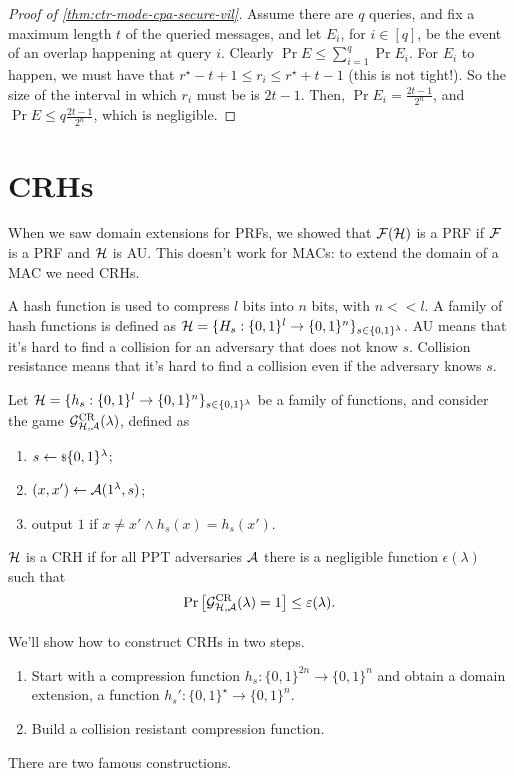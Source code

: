 \begin{proof}[Proof of \cref{thm:ctr-mode-cpa-secure-vil}]
	Assume there are $q$ queries, and fix a maximum length $t$ of the queried messages, and let $E_i$, for $i \in [q]$, be the event of an overlap happening at query $i$.
	Clearly $\Pr{E} \le \sum_{i=1}^{q} \Pr{E_i}$.
	For $E_i$ to happen, we must have that $r^{\star} - t + 1 \le r_i \le r^{\star} + t - 1$ (this is not tight!).
	So the size of the interval in which $r_i$ must be is $2t-1$.
	Then, $\Pr{E_i} = \frac{2t - 1}{2^n}$, and $\Pr{E} \le q \frac{2t - 1}{2^n}$, which is negligible.
\end{proof}

\section{\aclp{CRH}}

When we saw domain extensions for \acp{PRF}, we showed that $\mathcal{F}(\mathcal{H})$ is a \ac{PRF} if $\mathcal{F}$ is a \ac{PRF} and $\mathcal{H}$ is \ac{AU}.
This doesn't work for \acp{MAC}: to extend the domain of a \ac{MAC} we need \acp{CRH}.

A hash function is used to compress $l$ bits into $n$ bits, with $n << l$.
A family of hash functions is defined as $\mathcal{H} = \{ H_s : \{0,1\}^{l} \to \{0,1\}^{n}\}_{s \in \{0,1\}^{\lambda}}$.
\ac{AU} means that it's hard to find a collision for an adversary that does not know $s$.
Collision resistance means that it's hard to find a collision even if the adversary knows $s$.

\begin{definition}
	Let $\mathcal{H} = \{h_s : \{0,1\}^{l} \to \{0,1\}^{n}\}_{s \in \{0,1\}^{\lambda}}$ be a family of functions, and consider the game $\mathcal{G}^{\scriptstyle \text{CR}}_{\mathcal{H},\mathcal{A}}(\lambda)$, defined as
	\begin{enumerate}
		\item $s \leftarrow {\scriptstyle \$} {\{0,1\}^{\lambda}}$;
		\item $(x,x') \leftarrow \mathcal{A} (1^{\lambda}, s)$;
		\item output $1$ if $x \neq x' \land h_s(x) = h_s(x')$.
	\end{enumerate}
	$\mathcal{H}$ is a \ac{CRH} if for all \ac{PPT} adversaries $\mathcal{A}$ there is a negligible function $\epsilon(\lambda)$ such that
	\begin{equation*}
		\mathop{\mathrm{Pr}}\limits_{} \left[ {\mathcal{G}^{\scriptstyle \text{CR}}_{\mathcal{H},\mathcal{A}}(\lambda) = 1} \right] \le \varepsilon(\lambda). \qedhere
	\end{equation*}
\end{definition}

We'll show how to construct \acp{CRH} in two steps.
\begin{enumerate}
	\item Start with a compression function $h_s : \{0,1\}^{2n} \to \{0,1\}^{n}$ and obtain a domain extension, \ie a function $h_s' : \{0,1\}^{\star} \to \{0,1\}^{n}$.
	\item Build a collision resistant compression function.
\end{enumerate}
There are two famous constructions.

